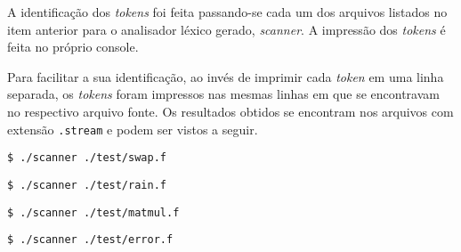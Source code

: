 \documentclass[a4paper,12pt]{article}
\begin{document}
A identificação dos \emph{tokens} foi feita passando-se cada um dos arquivos listados no item anterior para o analisador léxico gerado, \emph{scanner}. A impressão dos \emph{tokens} é feita no próprio console.

Para facilitar a sua identificação, ao invés de imprimir cada \emph{token} em uma linha separada, os \emph{tokens} foram impressos nas mesmas linhas em que se encontravam no respectivo arquivo fonte. Os resultados obtidos se encontram nos arquivos com extensão \texttt{.stream} e podem ser vistos a seguir.

\begin{verbatim}
$ ./scanner ./test/swap.f
\end{verbatim}


\begin{verbatim}
$ ./scanner ./test/rain.f
\end{verbatim}


\begin{verbatim}
$ ./scanner ./test/matmul.f
\end{verbatim}


\begin{verbatim}
$ ./scanner ./test/error.f
\end{verbatim}

\end{document}
